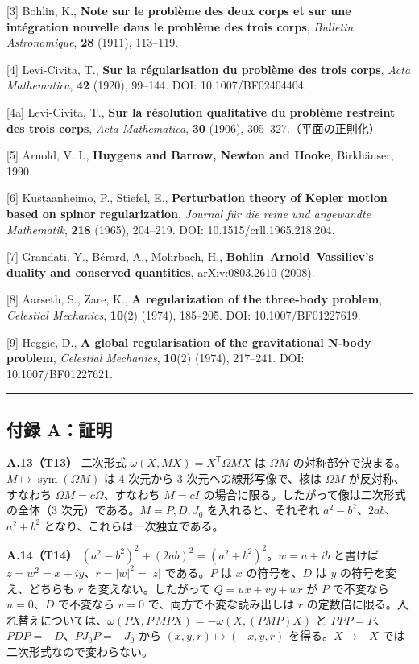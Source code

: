 \documentclass[
  a4paper,
]{ltjsarticle}
\begin{document}
{[}3{]} Bohlin, K., \textbf{Note sur le problème des deux corps et sur
une intégration nouvelle dans le problème des trois corps},
\emph{Bulletin Astronomique}, \textbf{28} (1911), 113--119.

{[}4{]} Levi-Civita, T., \textbf{Sur la régularisation du problème des
trois corps}, \emph{Acta Mathematica}, \textbf{42} (1920), 99--144. DOI:
10.1007/BF02404404.

{[}4a{]} Levi-Civita, T., \textbf{Sur la résolution qualitative du
problème restreint des trois corps}, \emph{Acta Mathematica},
\textbf{30} (1906), 305--327.（平面の正則化）

{[}5{]} Arnold, V. I., \textbf{Huygens and Barrow, Newton and Hooke},
Birkhäuser, 1990.

{[}6{]} Kustaanheimo, P., Stiefel, E., \textbf{Perturbation theory of
Kepler motion based on spinor regularization}, \emph{Journal für die
reine und angewandte Mathematik}, \textbf{218} (1965), 204--219. DOI:
10.1515/crll.1965.218.204.

{[}7{]} Grandati, Y., Bérard, A., Mohrbach, H.,
\textbf{Bohlin--Arnold--Vassiliev's duality and conserved quantities},
arXiv:0803.2610 (2008).

{[}8{]} Aarseth, S., Zare, K., \textbf{A regularization of the
three-body problem}, \emph{Celestial Mechanics}, \textbf{10}(2) (1974),
185--205. DOI: 10.1007/BF01227619.

{[}9{]} Heggie, D., \textbf{A global regularisation of the gravitational
N-body problem}, \emph{Celestial Mechanics}, \textbf{10}(2) (1974),
217--241. DOI: 10.1007/BF01227621.

\begin{center}\rule{0.5\linewidth}{0.5pt}\end{center}

\subsection{付録 A：証明}\label{ux4ed8ux9332-aux8a3cux660e}

\textbf{A.13（T13）} 二次形式 \(\omega(X,MX)=X^{\mathsf T}\Omega MX\) は
\(\Omega M\)
の対称部分で決まる。\(M\mapsto\operatorname{sym}(\Omega M)\) は 4
次元から 3 次元への線形写像で、核は \(\Omega M\) が反対称、すなわち
\(\Omega M=c\Omega\)、すなわち \(M=cI\)
の場合に限る。したがって像は二次形式の全体（3
次元）である。\(M=P,D,J_0\) を入れると、それぞれ
\(a^2-b^2\)、\(2ab\)、\(a^2+b^2\) となり、これらは一次独立である。

\textbf{A.14（T14）} \((a^2-b^2)^2+(2ab)^2=(a^2+b^2)^2\)。\(w=a+ib\)
と書けば \(z=w^2=x+iy\)、\(r=\lvert w\rvert^2=\lvert z\rvert\)
である。\(P\) は \(x\) の符号を、\(D\) は \(y\) の符号を変え、どちらも
\(r\) を変えない。したがって \(Q=ux+vy+wr\) が \(P\) で不変なら
\(u=0\)、\(D\) で不変なら \(v=0\) で、両方で不変な読み出しは \(r\)
の定数倍に限る。入れ替えについては、\(\omega(PX,P\,MPX)=-\omega(X,(PMP)X)\)
と \(PPP=P\)、\(PDP=-D\)、\(PJ_0P=-J_0\) から \((x,y,r)\mapsto(-x,y,r)\)
を得る。\(X\to-X\) では二次形式なので変わらない。
\end{document}
